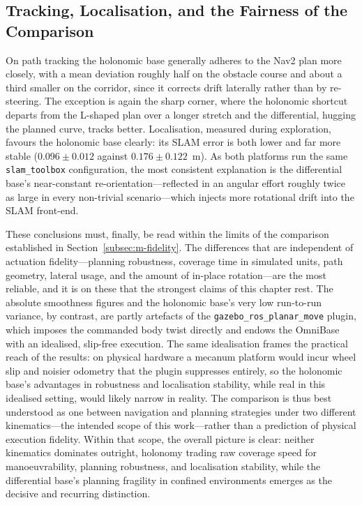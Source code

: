 \subsection{Tracking, Localisation, and the Fairness of the Comparison}
\label{subsec:disc-tracking}

On path tracking the holonomic base generally adheres to the Nav2 plan more closely, with a mean deviation roughly half on the obstacle course and about a third smaller on the corridor, since it corrects drift laterally rather than by re-steering. The exception is again the sharp corner, where the holonomic shortcut departs from the L-shaped plan over a longer stretch and the differential, hugging the planned curve, tracks better. Localisation, measured during exploration, favours the holonomic base clearly: its SLAM error is both lower and far more stable ($0.096 \pm 0.012$ against $0.176 \pm 0.122$~m). As both platforms run the same \texttt{slam\_toolbox} configuration, the most consistent explanation is the differential base's near-constant re-orientation---reflected in an angular effort roughly twice as large in every non-trivial scenario---which injects more rotational drift into the SLAM front-end.

These conclusions must, finally, be read within the limits of the comparison established in Section~\ref{subsec:m-fidelity}. The differences that are independent of actuation fidelity---planning robustness, coverage time in simulated units, path geometry, lateral usage, and the amount of in-place rotation---are the most reliable, and it is on these that the strongest claims of this chapter rest. The absolute smoothness figures and the holonomic base's very low run-to-run variance, by contrast, are partly artefacts of the \texttt{gazebo\_ros\_planar\_move} plugin, which imposes the commanded body twist directly and endows the OmniBase with an idealised, slip-free execution. The same idealisation frames the practical reach of the results: on physical hardware a mecanum platform would incur wheel slip and noisier odometry that the plugin suppresses entirely, so the holonomic base's advantages in robustness and localisation stability, while real in this idealised setting, would likely narrow in reality. The comparison is thus best understood as one between navigation and planning strategies under two different kinematics---the intended scope of this work---rather than a prediction of physical execution fidelity. Within that scope, the overall picture is clear: neither kinematics dominates outright, holonomy trading raw coverage speed for manoeuvrability, planning robustness, and localisation stability, while the differential base's planning fragility in confined environments emerges as the decisive and recurring distinction.